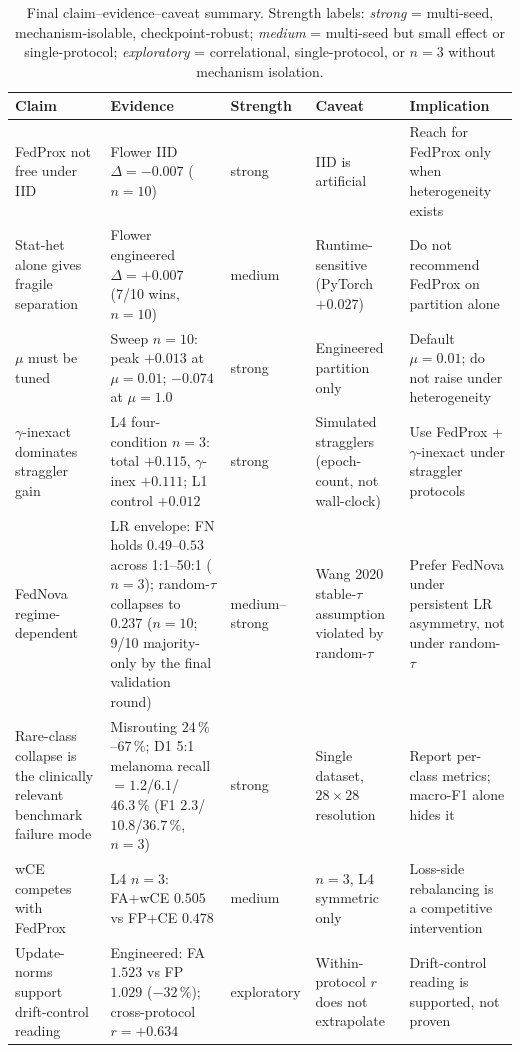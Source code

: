 \begin{table}[h]
\centering
\small
\caption{Final claim--evidence--caveat summary. Strength labels: \emph{strong}
= multi-seed, mechanism-isolable, checkpoint-robust; \emph{medium} =
multi-seed but small effect or single-protocol; \emph{exploratory} =
correlational, single-protocol, or $n=3$ without mechanism isolation.}
\label{tab:final-claims}
\begin{tabular}{p{3.0cm}p{3.6cm}p{1.6cm}p{2.6cm}p{2.6cm}}
\hline
Claim & Evidence & Strength & Caveat & Implication \\
\hline
FedProx not free under IID & Flower IID $\Delta = -0.007$ ($n=10$) & strong & IID is artificial & Reach for FedProx only when heterogeneity exists \\
Stat-het alone gives fragile separation & Flower engineered $\Delta = +0.007$ (7/10 wins, $n=10$) & medium & Runtime-sensitive (PyTorch $+0.027$) & Do not recommend FedProx on partition alone \\
$\mu$ must be tuned & Sweep $n=10$: peak $+0.013$ at $\mu = 0.01$; $-0.074$ at $\mu = 1.0$ & strong & Engineered partition only & Default $\mu = 0.01$; do not raise under heterogeneity \\
$\gamma$-inexact dominates straggler gain & L4 four-condition $n=3$: total $+0.115$, $\gamma$-inex $+0.111$; L1 control $+0.012$ & strong & Simulated stragglers (epoch-count, not wall-clock) & Use FedProx + $\gamma$-inexact under straggler protocols \\
FedNova regime-dependent & LR envelope: FN holds $0.49$--$0.53$ across 1:1--50:1 ($n=3$); random-$\tau$ collapses to $0.237$ ($n=10$; 9/10 majority-only by the final validation round) & medium--strong & Wang 2020 stable-$\tau$ assumption violated by random-$\tau$ & Prefer FedNova under persistent LR asymmetry, not under random-$\tau$ \\
Rare-class collapse is the clinically relevant benchmark failure mode & Misrouting $24\,\%$--$67\,\%$; D1 5:1 melanoma recall $= 1.2$/$6.1$/$46.3\,\%$ (F1 $2.3$/$10.8$/$36.7\,\%$, $n=3$) & strong & Single dataset, $28 \times 28$ resolution & Report per-class metrics; macro-F1 alone hides it \\
wCE competes with FedProx & L4 $n=3$: FA+wCE $0.505$ vs FP+CE $0.478$ & medium & $n=3$, L4 symmetric only & Loss-side rebalancing is a competitive intervention \\
Update-norms support drift-control reading & Engineered: FA $1.523$ vs FP $1.029$ ($-32\,\%$); cross-protocol $r = +0.634$ & exploratory & Within-protocol $r$ does not extrapolate & Drift-control reading is supported, not proven \\
\hline
\end{tabular}
\end{table}
